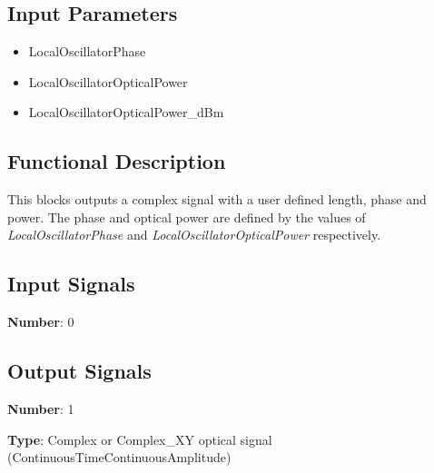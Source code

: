 \documentclass[../../sdf/tex/BPSK_system.tex]{subfiles}
\date{}
\begin{document}
\onlyinsubfile{\maketitle}

\subsection*{Input Parameters}

\begin{multicols}{2}
	\begin{itemize}
		\item LocalOscillatorPhase
		\item LocalOscillatorOpticalPower
		\item LocalOscillatorOpticalPower\_dBm
	\end{itemize}
\end{multicols}

\subsection*{Functional Description}

This blocks outputs a complex signal with a user defined length, phase and power. The phase and optical power are defined by the values of \textit{LocalOscillatorPhase} and \textit{LocalOscillatorOpticalPower} respectively.
\subsection*{Input Signals}

\textbf{Number}: 0

\subsection*{Output Signals}

\textbf{Number}: 1

\textbf{Type}: Complex or Complex\_XY optical signal (ContinuousTimeContinuousAmplitude)
\end{document}
